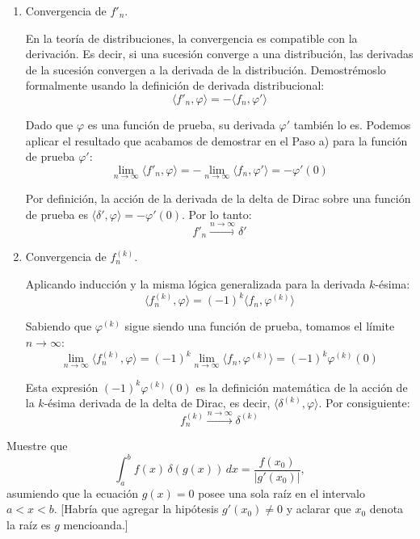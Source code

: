 \documentclass[11pt,spanish]{article}
\newcounter{problema}
\newcommand{\prob}{\stepcounter{problema} \vspace{.5cm} \noindent{\bf Problema \arabic{problema}: }}
\begin{document}
\begin{enumerate}
Tomando el límite de toda la suma cuando $n \to \infty$, todos los términos con $m \ge 1$ se anulan y solo sobrevive el término con $m=0$:
$$\lim_{n \to \infty} \langle f_n, \varphi \rangle = \frac{\varphi(0)}{0!} \cdot 1 + 0 + 0 + \dots = \varphi(0)$$

Como la acción de la delta de Dirac se define precisamente como $\langle \delta, \varphi \rangle = \varphi(0)$, concluimos que:
$$f_n \xrightarrow{n \to \infty} \delta$$

\item Convergencia de $f'_n$.

En la teoría de distribuciones, la convergencia es compatible con la derivación. Es decir, si una sucesión converge a una distribución, las derivadas de la sucesión convergen a la derivada de la distribución. Demostrémoslo formalmente usando la definición de derivada distribucional:
$$\langle f'_n, \varphi \rangle = - \langle f_n, \varphi' \rangle$$

Dado que $\varphi$ es una función de prueba, su derivada $\varphi'$ también lo es. Podemos aplicar el resultado que acabamos de demostrar en el Paso a) para la función de prueba $\varphi'$:
$$\lim_{n \to \infty} \langle f'_n, \varphi \rangle = -\lim_{n \to \infty} \langle f_n, \varphi' \rangle = - \varphi'(0)$$

Por definición, la acción de la derivada de la delta de Dirac sobre una función de prueba es $\langle \delta', \varphi \rangle = -\varphi'(0)$. Por lo tanto:
$$f'_n \xrightarrow{n \to \infty} \delta'$$

\item Convergencia de $f_n^{(k)}$.

Aplicando inducción y la misma lógica generalizada para la derivada $k$-ésima:
$$\langle f_n^{(k)}, \varphi \rangle = (-1)^k \langle f_n, \varphi^{(k)} \rangle$$

Sabiendo que $\varphi^{(k)}$ sigue siendo una función de prueba, tomamos el límite $n \to \infty$:
$$\lim_{n \to \infty} \langle f_n^{(k)}, \varphi \rangle = (-1)^k \lim_{n \to \infty} \langle f_n, \varphi^{(k)} \rangle = (-1)^k \varphi^{(k)}(0)$$

Esta expresión $(-1)^k \varphi^{(k)}(0)$ es la definición matemática de la acción de la $k$-ésima derivada de la delta de Dirac, es decir, $\langle \delta^{(k)}, \varphi \rangle$. Por consiguiente:
$$f_n^{(k)} \xrightarrow{n \to \infty} \delta^{(k)}$$
\end{enumerate}


\prob Muestre que
\[
\int_a^b f(x)\,\delta(g(x))\,dx = \frac{f(x_0)}{|g'(x_0)|},
\]
asumiendo que la ecuación $g(x)=0$ posee una sola raíz en el intervalo $a<x<b$.
{\color{red} [Habría que agregar la hipótesis $g'(x_0)\neq 0$ y aclarar que $x_0$ denota la raíz es $g$ mencioanda.]}
\end{document}
